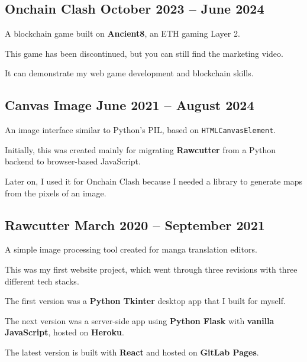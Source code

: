\subsection{{Onchain Clash \hfill October 2023 -- June 2024}}
\begin{zitemize}
\item A blockchain game built on \textbf{Ancient8}, an ETH gaming Layer 2.
\item This game has been discontinued, but you can still find the marketing video.
\item It can demonstrate my web game development and blockchain skills.

\end{zitemize}

\subsection{{Canvas Image \hfill June 2021 -- August 2024}}
\begin{zitemize}
\item An image interface similar to Python's PIL, based on \texttt{HTMLCanvasElement}.
\item Initially, this was created mainly for migrating \textbf{Rawcutter} from a Python backend to browser-based JavaScript.
\item Later on, I used it for Onchain Clash because I needed a library to generate maps from the pixels of an image.

\end{zitemize}

\subsection{{Rawcutter \hfill March 2020 -- September 2021}}
\begin{zitemize}
\item A simple image processing tool created for manga translation editors.  
\item This was my first website project, which went through three revisions with three different tech stacks.  
\item The first version was a \textbf{Python Tkinter} desktop app that I built for myself.  
\item The next version was a server-side app using \textbf{Python Flask} with \textbf{vanilla JavaScript}, hosted on \textbf{Heroku}.  
\item The latest version is built with \textbf{React }and hosted on \textbf{GitLab Pages}.  


\end{zitemize}



